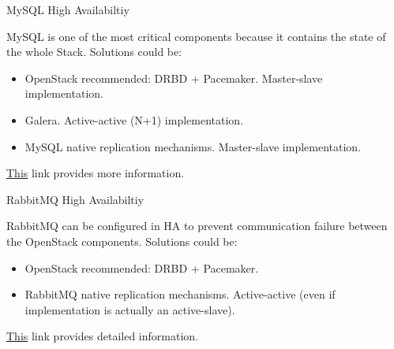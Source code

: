 \documentclass[english,serif,mathserif]{beamer}
\begin{document}
\begin{frame}{MySQL High Availabiltiy}

MySQL is one of the most critical components because it contains
the state of the whole Stack. Solutions could be:

\begin{itemize}
\item OpenStack recommended: DRBD + Pacemaker. Master-slave implementation.
\item Galera. Active-active (N+1) implementation.
\item MySQL native replication mechanisms. Master-slave implementation. 
\end{itemize}

{\color{blue}\href{http://docs.openstack.org/high-availability-guide/content/s-mysql.html}{This}} 
link provides more information.

\end{frame}

\begin{frame}{RabbitMQ High Availabiltiy}

RabbitMQ can be configured in HA to prevent communication failure
between the OpenStack components. Solutions could be:

\begin{itemize}
\item OpenStack recommended: DRBD + Pacemaker.
\item RabbitMQ native replication mechanisms. 
Active-active (even if implementation is actually an active-slave).
\end{itemize}

{\color{blue}\href{http://docs.openstack.org/high-availability-guide/content/s-rabbitmq.html}{This}} 
link provides detailed information. 

\end{frame}
\end{document}

